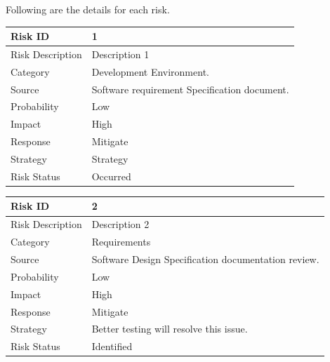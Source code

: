 \documentclass[oneside,a4paper,12pt]{report}
\begin{document}
\begin{table}[!htbp]
Following are the details for each risk.
\begin{table}[!htbp]
\begin{center}
\def\arraystretch{1.5}
\begin{tabularx}{\textwidth}{| l | X |}
\hline
Risk ID	& 1 \\ \hline
Risk Description	& Description 1 \\ \hline
Category	& Development Environment. \\ \hline
Source	& Software requirement Specification document. \\ \hline
Probability	& Low \\ \hline
Impact	& High \\ \hline
Response	& Mitigate \\ \hline
Strategy	& Strategy \\ \hline
Risk Status	& Occurred \\ \hline
\end{tabularx}
\end{center}
\label{tab:risk1}
\end{table}

\begin{table}[!htbp]
\begin{center}
\def\arraystretch{1.5}
\begin{tabularx}{\textwidth}{| l | X |}
\hline
Risk ID	& 2 \\ \hline
Risk Description	& Description 2 \\ \hline
Category	& Requirements \\ \hline
Source	& Software Design Specification documentation review. \\ \hline
Probability	& Low \\ \hline
Impact	& High \\ \hline
Response	& Mitigate \\ \hline
Strategy	& Better testing will resolve this issue.  \\ \hline
Risk Status	& Identified \\ \hline
\end{tabularx}
\end{center}
\label{tab:risk2}
\end{table}


\end{table}
\end{document}
